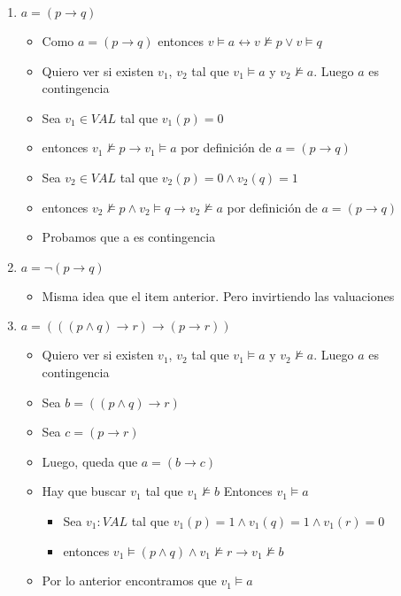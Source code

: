 \documentclass[14pt,a4paper,fleqn]{article}
\newcommand{\implica}[2]{(#1 \rightarrow #2)}
\newcommand{\entonces}{\rightarrow}
\newcommand{\no}[1]{\neg #1}
\newcommand{\satisface}{\vDash}
\newcommand{\nosatisf}{\nvDash}
\newcommand{\sii}{\leftrightarrow}
\newcommand{\conj}[2]{(#1 \wedge #2)}
\begin{document}
\begin{enumerate}
	\item $a=\implica p q $
	\begin{itemize}
		\item Como $a=(p \entonces q) $ entonces $v \satisface a \sii v \nosatisf p \vee v \satisface q$
		\item Quiero ver si existen $v_{1}$, $v_{2}$ tal que $v_{1} \satisface a$ y $v_{2} \nosatisf a$. Luego $a$ es contingencia
		\item Sea $v_{1} \in VAL$ tal que $v_{1}(p) = 0$ 
		\item entonces $v_{1} \nosatisf p \entonces v_{1} \satisface a $ por definición de $a=(p \entonces q)$
		\item Sea $v_{2} \in VAL$ tal que $v_{2}(p) = 0 \wedge v_{2}(q)=1$ 
		\item entonces $v_{2} \nosatisf p \wedge v_{2} \satisface q \entonces v_{2} \nosatisf a $ por definición de $a=(p \entonces q)$
		\item Probamos que a es contingencia
	\end{itemize}
	\item $a=\no{\implica{p}{q}}$	
	\begin{itemize}
		\item Misma idea que el item anterior. Pero invirtiendo las valuaciones
	\end{itemize}
	\item $a=\implica{\implica{\conj{p}{q}}{r}}{\implica{p}{r}}$
	\begin{itemize}
		\item Quiero ver si existen $v_{1}$, $v_{2}$ tal que $v_{1} \satisface a$ y $v_{2} \nosatisf a$. Luego $a$ es contingencia
		\item Sea $b = \implica{\conj{p}{q}}{r}$
		\item Sea $c = \implica{p}{r}$	
		\item Luego, queda que $a = \implica b c$
		\vspace{5pt}		
		\item Hay que buscar $v_{1}$ tal que $v_{1} \nosatisf b $ Entonces $v_{1} \satisface a$
		\begin{itemize}
			\item Sea $v_{1}:VAL$ tal que  $v_{1}(p) = 1 \wedge v_{1}(q) = 1 \wedge v_{1}(r) = 0$
			\item entonces $v_{1} \satisface \conj p q \wedge v_{1} \nosatisf r \entonces v_{1} \nosatisf b$ 
		\end{itemize}
		\item Por lo anterior encontramos que $v_{1} \satisface a$

\end{itemize}
\end{enumerate}
\end{document}
